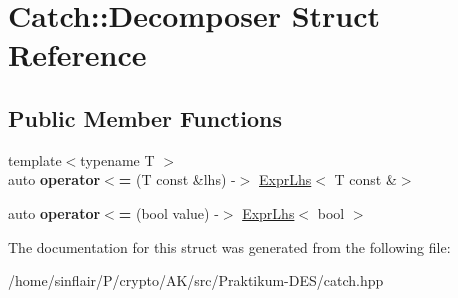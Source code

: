\hypertarget{structCatch_1_1Decomposer}{}\section{Catch\+:\+:Decomposer Struct Reference}
\label{structCatch_1_1Decomposer}
\subsection*{Public Member Functions}
\begin{DoxyCompactItemize}
\item 
\mbox{\label{structCatch_1_1Decomposer_a20b5b8c0e2ff0328a019ae1a8deca03a}} 
{\footnotesize template$<$typename T $>$ }\\auto {\bfseries operator$<$=} (T const \&lhs) -\/$>$ \hyperlink{classCatch_1_1ExprLhs}{Expr\+Lhs}$<$ T const \&$>$
\item 
\mbox{\label{structCatch_1_1Decomposer_aac129b94903ae1339d5709049d83613b}} 
auto {\bfseries operator$<$=} (bool value) -\/$>$ \hyperlink{classCatch_1_1ExprLhs}{Expr\+Lhs}$<$ bool $>$
\end{DoxyCompactItemize}


The documentation for this struct was generated from the following file\+:\begin{DoxyCompactItemize}
\item 
/home/sinflair/\+P/crypto/\+A\+K/src/\+Praktikum-\/\+D\+E\+S/catch.\+hpp\end{DoxyCompactItemize}
